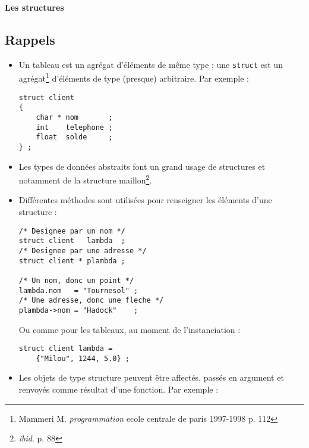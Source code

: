 \centerline{\Large\bf Les structures}
\label{Structures}
\label{structures}
 
 \noindent\hrulefill  
\begin{multicols}{2}

\setcounter{section}{0}
\section*{Rappels}

\begin{itemize} 
\item Un tableau est un agr\'egat d'\'el\'ements de m\^eme type ; une {\tt struct} est un
agr\'egat\footnote{Mammeri M. {\it programmation} {\sc ecole centrale de paris}
{\tiny 1997-1998} p. 112}
d'\'el\'ements de type (presque) arbitraire. Par exemple :

{\small
\begin{verbatim}  
struct client
{
    char * nom       ;
    int    telephone ;
    float  solde     ;
} ;
\end{verbatim} }

\item Les types de donn\'ees abstraits font un grand usage de structures et notamment
de la structure {\sc maillon}\footnote{{\it ibid}. p. 88}.

\item Diff\'erentes m\'ethodes sont utilis\'ees pour renseigner les \'el\'ements
d'une structure  :

{\small
\begin{verbatim}  
/* Designee par un nom */
struct client   lambda  ;
/* Designee par une adresse */
struct client * plambda ;
 
/* Un nom, donc un point */
lambda.nom   = "Tournesol" ;
/* Une adresse, donc une fleche */
plambda->nom = "Hadock"    ;
\end{verbatim} }

Ou comme pour les tableaux, au moment de l'instanciation :

{\small
\begin{verbatim}  
struct client lambda =
    {"Milou", 1244, 5.0} ;
\end{verbatim} }

\item Les objets de type structure peuvent \^etre affect\'es, pass\'es en argument
et renvoy\'es comme r\'esultat d'une fonction. Par exemple :


\end{itemize}
\end{multicols}
